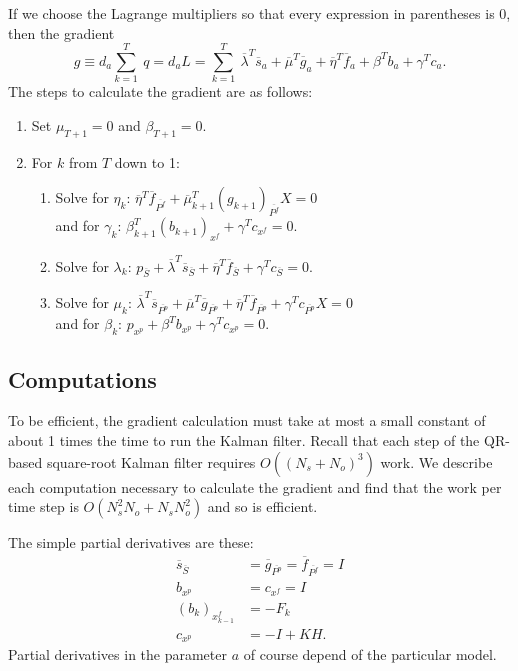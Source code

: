 \documentclass[10pt,fleqn]{article}
\renewcommand{\vec}[1]{\ensuremath{\overline{#1}}}
\begin{document}
If we choose the Lagrange multipliers so that every expression in parentheses is
$0$, then the gradient
\begin{equation} \label{eq:gradient}
  g \equiv d_a \sum_{k = 1}^T \ q = d_a L = \sum_{k = 1}^T \ \vec\lambda^T
  \vec s_a + \vec\mu^T \vec g_a + \vec\eta^T \vec f_a + \beta^T b_a +
  \gamma^T c_a.
\end{equation}
The steps to calculate the gradient are as follows:
\begin{enumerate}
\item Set $\mu_{T+1} = 0$ and $\beta_{T+1} = 0$.
\item For $k$ from $T$ down to 1:
  \begin{enumerate}
  \item Solve for $\eta_k$: $\vec\eta^T \vec f_{\vec{P^f}} + \vec\mu_{k+1}^T
    (g_{k+1})_{\vec{P^f}} X = 0$ \\
  and for $\gamma_k$: $\beta_{k+1}^T (b_{k+1})_{x^f} + \gamma^T c_{x^f}
    = 0$.
  \item Solve for $\lambda_k$: $p_{\vec S} + \vec\lambda^T \vec s_{\vec S} +
    \vec\eta^T \vec f_{\vec S} + \gamma^T c_{\vec S} = 0$.
  \item Solve for $\mu_k$: $\vec\lambda^T \vec s_{\vec{P^p}} + \vec\mu^T \vec
    g_{\vec{P^p}} + \vec\eta^T \vec f_{\vec{P^p}} + \gamma^T c_{\vec{P^p}} X =
    0$ \\
    and for $\beta_k$: $p_{x^p} + \beta^T b_{x^p} + \gamma^T c_{x^p} = 0$.
  \end{enumerate}
\end{enumerate}

\subsection{Computations}
To be efficient, the gradient calculation must take at most a small constant of
about 1 times the time to run the Kalman filter. Recall that each step of the
QR-based square-root Kalman filter requires $O((N_s + N_o)^3)$ work. We describe
each computation necessary to calculate the gradient and find that the work per
time step is $O(N_s^2 N_o + N_s N_o^2)$ and so is efficient.

The simple partial derivatives are these:
\begin{align*}
  \vec s_{\vec S} &= \vec g_{\vec{P^p}} = \vec f_{\vec{P^f}} = I \\
  b_{x^p} &= c_{x^f} = I \\
  (b_k)_{x^f_{k-1}} &= -F_k \\
  c_{x^p} &= -I + K H.
\end{align*}
Partial derivatives in the parameter $a$ of course depend of the particular
model.
\end{document}
